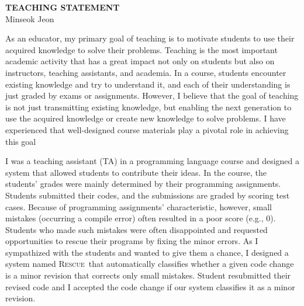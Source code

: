 \documentclass[a4paper, 11pt]{article}
\newcommand{\Rescue}{\textsc{Rescue}}
\begin{document}
\pagestyle{fancy}
\renewcommand{\headrulewidth}{0pt}
\renewcommand{\footrulewidth}{0pt}



\begin{small}


\newcommand{\myparagraph}[1]{\medskip\noindent{\it \textbf{#1.}}}

\begin{center}
{\LARGE \bf TEACHING STATEMENT}\\
\vspace*{0.1cm}
{\normalsize Minseok Jeon}
\end{center}



As an educator, my primary goal of teaching is to motivate students to use their acquired knowledge to solve their problems. Teaching is the most important academic activity that has a great impact not only on students but also on instructors, teaching assistants, and academia. In a course, students encounter existing knowledge and try to understand it, and each of their understanding is just graded by exams or assignments. However, I believe that the goal of teaching is not just transmitting existing knowledge, but enabling the next generation to use the acquired knowledge or create new knowledge to solve problems. I have experienced that well-designed course materials play a pivotal role in achieving this goal








\myparagraph{Teaching Experience}
I was a teaching assistant (TA) in a programming language course and designed a system that allowed students to contribute their ideas. In the course, the students' grades were mainly determined by their programming assignments. 
Students submitted their codes, and the submissions are graded by scoring test cases. 
Because of programming assignments' characteristic, however, small mistakes (occurring a compile error) often resulted in a poor score (e.g., 0). Students who made such mistakes were often disappointed and requested opportunities to rescue their programs by fixing the minor errors. As I sympathized with the students and wanted to give them a chance, I designed a system named \Rescue~that automatically classifies whether a given code change is a minor revision that corrects only small mistakes. Student resubmitted their revised code and I accepted the code change if our system classifies it as a minor revision. 




\end{small}
\end{document}

